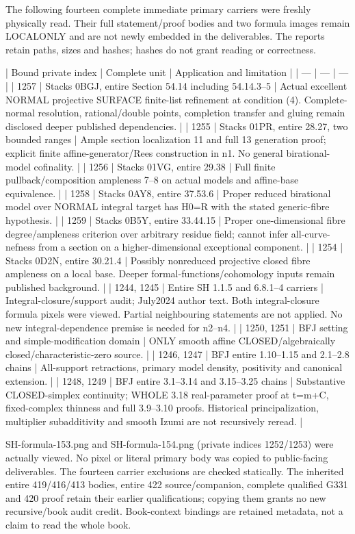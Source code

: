 \documentclass[11pt]{article}
\begin{document}
The following fourteen complete immediate primary carriers were freshly physically read. Their full statement/proof bodies and two formula images remain LOCALONLY and are not newly embedded in the deliverables. The reports retain paths, sizes and hashes; hashes do not grant reading or correctness.

| Bound private index | Complete unit | Application and limitation |
| --- | --- | --- |
| 1257 | Stacks 0BGJ, entire Section 54.14 including 54.14.3--5 | Actual excellent NORMAL projective SURFACE finite-list refinement at condition (4). Complete-normal resolution, rational/double points, completion transfer and gluing remain disclosed deeper published dependencies. |
| 1255 | Stacks 01PR, entire 28.27, two bounded ranges | Ample section localization 11 and full 13 generation proof; explicit finite affine-generator/Rees construction in n1. No general birational-model cofinality. |
| 1256 | Stacks 01VG, entire 29.38 | Full finite pullback/composition ampleness 7--8 on actual models and affine-base equivalence. |
| 1258 | Stacks 0AY8, entire 37.53.6 | Proper reduced birational model over NORMAL integral target has H0=R with the stated generic-fibre hypothesis. |
| 1259 | Stacks 0B5Y, entire 33.44.15 | Proper one-dimensional fibre degree/ampleness criterion over arbitrary residue field; cannot infer all-curve-nefness from a section on a higher-dimensional exceptional component. |
| 1254 | Stacks 0D2N, entire 30.21.4 | Possibly nonreduced projective closed fibre ampleness on a local base. Deeper formal-functions/cohomology inputs remain published background. |
| 1244, 1245 | Entire SH 1.1.5 and 6.8.1--4 carriers | Integral-closure/support audit; July2024 author text. Both integral-closure formula pixels were viewed. Partial neighbouring statements are not applied. No new integral-dependence premise is needed for n2--n4. |
| 1250, 1251 | BFJ setting and simple-modification domain | ONLY smooth affine CLOSED/algebraically closed/characteristic-zero source. |
| 1246, 1247 | BFJ entire 1.10--1.15 and 2.1--2.8 chains | All-support retractions, primary model density, positivity and canonical extension. |
| 1248, 1249 | BFJ entire 3.1--3.14 and 3.15--3.25 chains | Substantive CLOSED-simplex continuity; WHOLE 3.18 real-parameter proof at t=m+C, fixed-complex thinness and full 3.9--3.10 proofs. Historical principalization, multiplier subadditivity and smooth Izumi are not recursively reread. |

SH-formula-153.png and SH-formula-154.png (private indices 1252/1253) were actually viewed. No pixel or literal primary body was copied to public-facing deliverables. The fourteen carrier exclusions are checked statically. The inherited entire 419/416/413 bodies, entire 422 source/companion, complete qualified G331 and 420 proof retain their earlier qualifications; copying them grants no new recursive/book audit credit. Book-context bindings are retained metadata, not a claim to read the whole book.
\end{document}
